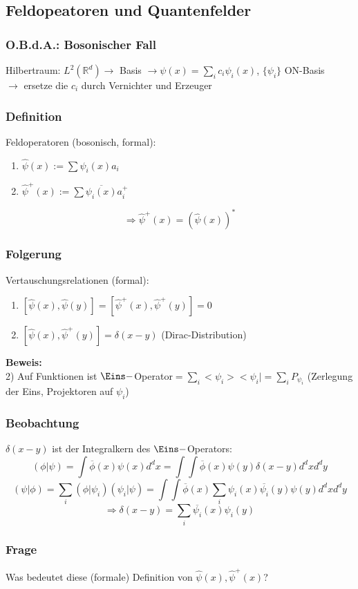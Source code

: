 \documentclass[twoside,a4paper]{scrartcl}
\newcommand{\R}{\mathbb{R}}
\renewcommand{\1}{\mathds{1}}
\newcommand{\Ra}{\Rightarrow}
\newcommand{\ra}{\rightarrow}
\renewcommand{\R}{\mathbb{R}}
\begin{document}
\subsection{Feldopeatoren und Quantenfelder}
\subsubsection*{O.B.d.A.: Bosonischer Fall}
Hilbertraum: $L^2(\R^d) \ra$ Basis $\ra \psi(x)=\sum_i c_i \psi_i(x)$, $\{\psi_i\}$ ON-Basis\\
$\ra$ ersetze die $c_i$ durch Vernichter und Erzeuger
\subsubsection*{Definition}
Feldoperatoren (bosonisch, formal):
\begin{enumerate}
\item $\hat \psi(x):= \sum \psi_i(x)a_i$
\item $\hat \psi^+(x):= \sum \overline{\psi_i(x)}a_i^+$
\end{enumerate}
$$\Ra \hat \psi^+(x)=(\hat \psi(x))^*$$
\subsubsection*{Folgerung}
Vertauschungsrelationen (formal):
\begin{enumerate}
\item $[\hat \psi(x), \hat \psi(y)]=[\hat \psi^+(x), \hat \psi^+(y)]=0$
\item $[\hat \psi(x), \hat \psi^+(y)]=\delta(x-y)$ (Dirac-Distribution)
\end{enumerate}
\textbf{Beweis:}\\
2) Auf Funktionen ist $\Eins-$Operator$=\sum_i <\psi_i><\psi_i|=\sum_i P_{\psi_i}$ (Zerlegung der Eins, Projektoren auf $\psi_i$)
\subsubsection*{Beobachtung}
$\delta(x-y)$ ist der Integralkern des $\Eins-$Operators:
$$(\phi|\psi)=\int \overline{\phi}(x)\psi(x)d^dx= \int \int \overline{\phi}(x)\psi(y) \delta(x-y)d^dxd^dy$$
$$(\psi|\phi)=\sum_i (\phi|\psi_i)(\psi_i|\psi)=\int \int \overline{\phi}(x)\sum_i \psi_i(x)\overline{\psi_i}(y)\psi(y) d^dxd^dy$$
$$\Ra \delta(x-y)=\sum_i \overline{\psi_i}(x) \psi_i(y)$$
\subsubsection*{Frage}
Was bedeutet diese (formale) Definition von $\hat \psi(x), \hat \psi^+(x)$?
\end{document}
